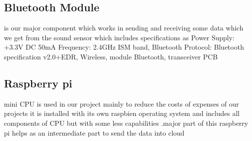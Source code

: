 \subsection{Bluetooth Module} is our major component which works in sending and receiving some data which we get from the sound sensor which includes specifications as Power Supply: +3.3V DC 50mA Frequency: 2.4GHz ISM band, Bluetooth Protocol: Bluetooth specification v2.0+EDR, Wireless, module Bluetooth, transceiver PCB
\subsection{Raspberry pi} mini CPU is used in our project mainly to reduce the costs of expenses of our projects it is installed with its own raspbien operating system and includes all components of CPU but with some less capabilities .major part of this raspberry pi helps as an intermediate part to send the data into cloud

